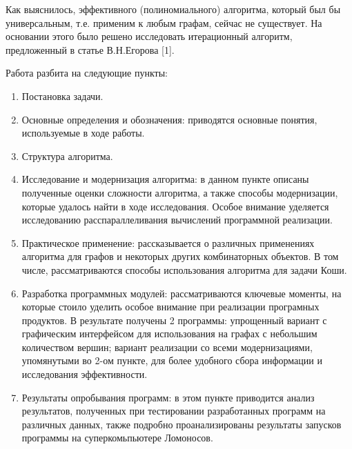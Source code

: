 Как выяснилось, эффективного (полиномиального) алгоритма, который был бы универсальным, т.е. применим к любым графам, сейчас не существует. На основании этого было решено исследовать итерационный алгоритм, предложенный в статье В.Н.Егорова [1].

Работа разбита на следующие пункты:
\begin{enumerate}
\item Постановка задачи.
\item Основные определения и обозначения: приводятся основные понятия, используемые в ходе работы.
\item Структура алгоритма.
\item Исследование и модернизация алгоритма: в данном пункте описаны полученные оценки сложности алгоритма, а также способы модернизации, которые удалось найти в ходе исследования. Особое внимание уделяется исследованию расспараллеливания вычислений программной реализации.
\item Практическое применение: рассказывается о различных применениях алгоритма для графов и некоторых других комбинаторных объектов. В том числе, рассматриваются способы использования алгоритма для задачи Коши.
\item Разработка программных модулей: рассматриваются ключевые моменты, на которые стоило уделить особое внимание при реализации програмных продуктов. В результате получены 2 программы: упрощенный вариант с графическим интерфейсом для использования на графах с небольшим количеством вершин; вариант реализации со всеми модернизациями, упомянутыми во 2-ом пункте, для более удобного сбора информации и исследования эффективности.
\item Результаты опробывания программ: в этом пункте приводится анализ результатов, полученных при тестировании разработанных программ на различных данных, также подробно проанализированы результаты запусков программы на суперкомьпьютере Ломоносов.
\end{enumerate}